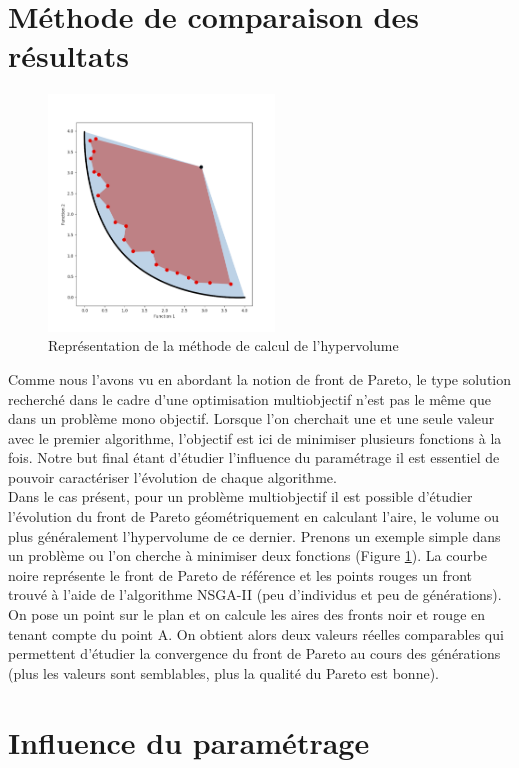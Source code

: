 \documentclass[12pt]{report}
\begin{document}
    \section{Méthode de comparaison des résultats}
      \begin{figure}
        \centering
        \includegraphics[width=6cm]{img/hypervolume.png}
        \caption{Représentation de la méthode de calcul de l'hypervolume}
        \label{hypervolume}
      \end{figure}
      Comme nous l'avons vu en abordant la notion de front de Pareto, le type solution recherché dans le cadre d'une optimisation multiobjectif n'est pas le même que dans un problème mono objectif. Lorsque l'on cherchait une et une seule valeur avec le premier algorithme, l'objectif est ici de minimiser plusieurs fonctions à la fois. Notre but final étant d'étudier l'influence du paramétrage il est essentiel de pouvoir caractériser l'évolution de chaque algorithme. \\
      Dans le cas présent, pour un problème multiobjectif il est possible d'étudier l'évolution du front de Pareto géométriquement en calculant l'aire, le volume ou plus généralement l'hypervolume de ce dernier.
      Prenons un exemple simple dans un problème ou l'on cherche à minimiser deux fonctions (Figure \ref{hypervolume}). La courbe noire représente le front de Pareto de référence et les points rouges un front trouvé à l'aide de l'algorithme NSGA-II (peu d'individus et peu de générations). On pose un point sur le plan et on calcule les aires des fronts noir et rouge en tenant compte du point A. On obtient alors deux valeurs réelles comparables qui permettent d'étudier la convergence du front de Pareto au cours des générations (plus les valeurs sont semblables, plus la qualité du Pareto est bonne).
    \section{Influence du paramétrage}
\end{document}
